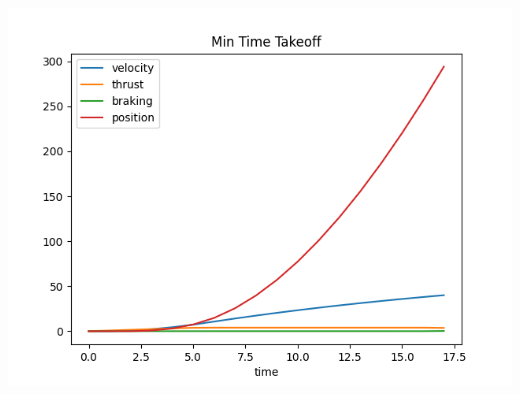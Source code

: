 \documentclass{article}
\begin{document}
\begin{enumerate}
    \begin{center}
    	\includegraphics[scale=0.5]{p2_plot}
    \end{center}
    

\end{enumerate}
\end{document}
